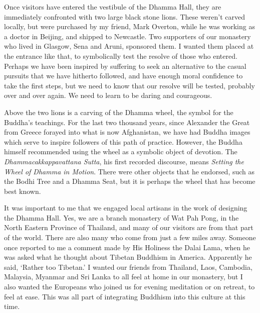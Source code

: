 
\enlargethispage{2\baselineskip}

Once visitors have entered the vestibule of the Dhamma Hall, they are
immediately confronted with two large black stone lions. These weren't
carved locally, but were purchased by my friend, Mark Overton, while he
was working as a doctor in Beijing, and shipped to Newcastle. Two
supporters of our monastery who lived in Glasgow, Sena and Aruni,
sponsored them. I wanted them placed at the entrance like that, to
symbolically test the resolve of those who entered. Perhaps we have been
inspired by suffering to seek an alternative to the casual pursuits that
we have hitherto followed, and have enough moral confidence to take the
first steps, but we need to know that our resolve will be tested,
probably over and over again. We need to learn to be daring and
courageous.

Above the two lions is a carving of the Dhamma wheel, the symbol for the
Buddha's teachings. For the last two thousand years, since Alexander the
Great from Greece\cite{greco} forayed into what is now Afghanistan, we have had Buddha
images which serve to inspire followers of this path of practice.
However, the Buddha himself recommended using the wheel as a symbolic
object of devotion. The \emph{Dhammacakkappavattana Sutta}, his first
recorded discourse, means \emph{Setting the Wheel of Dhamma in Motion}\cite{cakka}.
There were other objects that
he endorsed, such as the Bodhi Tree and a Dhamma Seat, but it is perhaps
the wheel that has become best known.

\enlargethispage*{\baselineskip}

It was important to me that we engaged local artisans in the work of
designing the Dhamma Hall. Yes, we are a branch monastery of Wat Pah
Pong, in the North Eastern Province of Thailand, and many of our visitors are from that part
of the world. There are also many who come from just a few miles away.
Someone once reported to me a comment made by His Holiness the Dalai
Lama, when he was asked what he thought about Tibetan Buddhism in
America. Apparently he said, `Rather too Tibetan.' I wanted our friends
from Thailand, Laos, Cambodia, Malaysia, Myanmar and Sri Lanka to all
feel at home in our monastery, but I also wanted the Europeans who
joined us for evening meditation or on retreat, to feel at ease. This
was all part of integrating Buddhism into this culture at this time.

